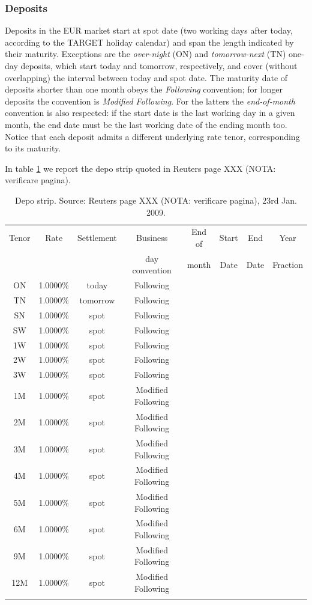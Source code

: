 \documentclass[11pt,reqno]{amsart}
\begin{document}
\subsubsection{\label{SecDepo}Deposits}
Deposits in the EUR market start at spot date (two working days after today, according to the TARGET holiday calendar) and span the length indicated by their maturity. Exceptions are the {\it over-night} (ON) and {\it tomorrow-next} (TN) one-day deposits, which start today and tomorrow, respectively, and cover (without overlapping) the interval between today and spot date.
The maturity date of deposits shorter than one month obeys the {\it Following} convention; for longer deposits the convention is {\it Modified Following}. For the latters the {\it end-of-month} convention is also respected: if the start date is the last working day in a given month, the end date must be the last working date of the ending month too. Notice that each deposit admits a different underlying rate tenor, corresponding to its maturity.
\par
In table \ref{tab:deposits} we report the depo strip quoted in Reuters page XXX (NOTA: verificare pagina).
\begin{table}[tbp]
\label{tab:deposits}
\begin{tabular}{cccccccc}
Tenor & Rate & Settlement & Business       & End of & Start & End  & Year \\
      &      &            & day convention & month   & Date  & Date & Fraction \\
ON & 1.0000\% & today & Following &  &  \\
TN & 1.0000\% & tomorrow & Following &  &  \\
SN & 1.0000\% & spot & Following &  &  \\
SW & 1.0000\% & spot & Following &  &  \\
1W & 1.0000\% & spot & Following &  &  \\
2W & 1.0000\% & spot & Following &  &  \\
3W & 1.0000\% & spot & Following &  &  \\
1M & 1.0000\% & spot & Modified Following &  &  \\
2M & 1.0000\% & spot & Modified Following &  &  \\
3M & 1.0000\% & spot & Modified Following &  &  \\
4M & 1.0000\% & spot & Modified Following &  &  \\
5M & 1.0000\% & spot & Modified Following &  &  \\
6M & 1.0000\% & spot & Modified Following &  &  \\
9M & 1.0000\% & spot & Modified Following &  &  \\
12M & 1.0000\% & spot & Modified Following &  &  \\
&  &  &  &  &
\end{tabular}%
\caption{Depo strip. Source: Reuters page XXX (NOTA: verificare pagina), 23rd Jan. 2009.}
\end{table}
\end{document}
